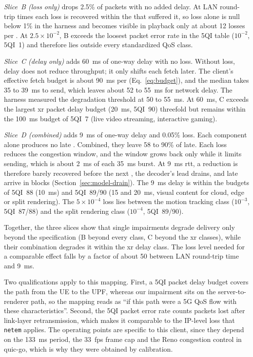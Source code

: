 \emph{Slice~B (loss only)} drops 2.5\% of packets with no added
delay. At LAN round-trip times each loss is recovered within the \gof
that suffered it, so loss alone is null below 1\% in the harness and
becomes visible in playback only at about 12 losses per \gof. At
$2.5 \times 10^{-2}$, B exceeds the loosest packet error rate in the
5QI table ($10^{-2}$, 5QI~1) and therefore lies outside every
standardized QoS class.

\emph{Slice~C (delay only)} adds \SI{60}{\milli\second} of one-way
delay with no loss. Without loss, delay does not reduce throughput; it
only shifts each fetch later. The client's effective fetch budget is
about \SI{90}{\milli\second} per \gof (Eq.~\eqref{eq:budget}), and
the median \gof takes 35 to \SI{39}{\milli\second} to send, which
leaves about 52 to \SI{55}{\milli\second} for network delay. The
harness measured the degradation threshold at 50 to
\SI{55}{\milli\second}. At \SI{60}{\milli\second}, C exceeds the
largest \gls{xr} packet delay budget (\SI{20}{\milli\second}, 5QI~90)
threefold but remains within the \SI{100}{\milli\second} budget of
5QI~7 (live video streaming, interactive gaming).

\emph{Slice~D (combined)} adds \SI{9}{\milli\second} of one-way delay
and 0.05\% loss. Each component alone produces no late \gofs.
Combined, they leave 58 to 90\% of \gofs late. Each loss reduces the
congestion window, and the window grows back only while it limits
sending, which is about \SI{2}{\milli\second} of each
\SI{35}{\milli\second} burst. At \SI{9}{\milli\second} \gls{rtt}, a
reduction is therefore barely recovered before the next \gof, the
decoder's lead drains, and late \gofs arrive in blocks
(Section~\ref{sec:model-drain}). The \SI{9}{\milli\second} delay is
within the budgets of 5QI~88 (\SI{10}{\milli\second}) and 5QI~89/90
(15 and \SI{20}{\milli\second}, visual content for cloud, edge or
split rendering). The $5 \times 10^{-4}$ loss lies between the motion
tracking class ($10^{-3}$, 5QI~87/88) and the split rendering class
($10^{-4}$, 5QI~89/90).

Together, the three slices show that single impairments degrade
delivery only beyond the specification (B beyond every class, C beyond
the \gls{xr} classes), while their combination degrades it within the
\gls{xr} delay class. The loss level needed for a comparable effect
falls by a factor of about 50 between LAN round-trip time and
\SI{9}{\milli\second}.

Two qualifications apply to this mapping. First, a 5QI packet delay
budget covers the path from the UE to the UPF, whereas our impairment
sits on the server-to-renderer path, so the mapping reads as ``if this
path were a 5G QoS flow with these characteristics''. Second, the 5QI
packet error rate counts packets lost after link-layer
retransmission, which makes it comparable to the IP-level loss that
\texttt{netem} applies. The operating points are specific to this
client, since they depend on the \SI{133}{\milli\second} \gof period,
the \SI{33}{fps} frame cap and the Reno congestion control in quic-go,
which is why they were obtained by calibration.

